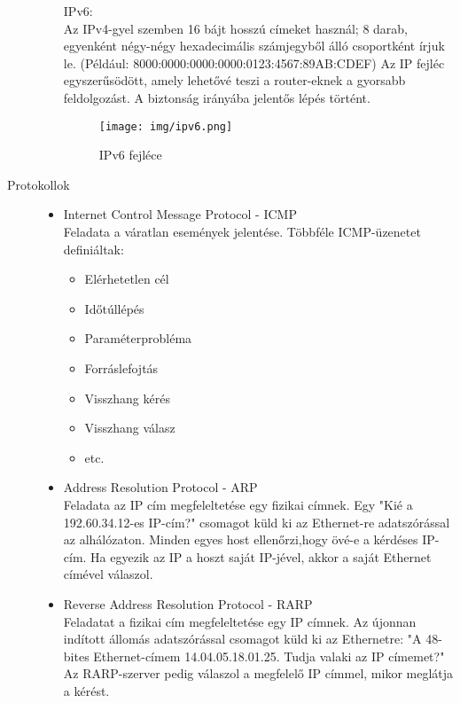 \documentclass[margin=0px]{article}
\begin{document}
\begin{description}
\begin{itemize}
                  IPv6:\\
                  Az IPv4-gyel szemben 16 bájt hosszú címeket használ; 8 darab, egyenként négy-négy hexadecimális számjegyből álló csoportként írjuk le. (Például: 8000:0000:0000:0000:0123:4567:89AB:CDEF) Az IP fejléc egyszerűsödött, amely lehetővé teszi a router-eknek a gyorsabb feldolgozást. A biztonság irányába jelentős lépés történt.

                  \begin{figure}[H]
                      \centering
                      \texttt{[image: img/ipv6.png]}
                      \caption{IPv6 fejléce}
                  \end{figure}


        \end{itemize}
    \item[Protokollok] \hfill
        \begin{itemize}
            \item Internet Control Message Protocol - ICMP \\
                  Feladata a váratlan események jelentése. Többféle ICMP-üzenetet definiáltak:
                  \begin{itemize}
                      \item Elérhetetlen cél
                      \item Időtúllépés
                      \item Paraméterprobléma
                      \item Forráslefojtás
                      \item Visszhang kérés
                      \item Visszhang válasz
                      \item etc.
                  \end{itemize}
            \item Address Resolution Protocol - ARP \\
                  Feladata az IP cím megfeleltetése egy fizikai címnek. Egy "Kié a 192.60.34.12-es IP-cím?" csomagot küld ki az Ethernet-re adatszórással az alhálózaton. Minden egyes host ellenőrzi,hogy övé-e a kérdéses IP-cím. Ha egyezik az IP a hoszt saját IP-jével, akkor a saját Ethernet címével válaszol.
            \item Reverse Address Resolution Protocol - RARP \\
                  Feladatat a fizikai cím megfeleltetése egy IP címnek. Az újonnan indított állomás adatszórással csomagot küld ki az Ethernetre: "A 48-bites Ethernet-címem 14.04.05.18.01.25. Tudja valaki az IP címemet?" Az RARP-szerver pedig válaszol a megfelelő IP címmel, mikor meglátja a kérést.

\end{itemize}
\end{description}
\end{document}
